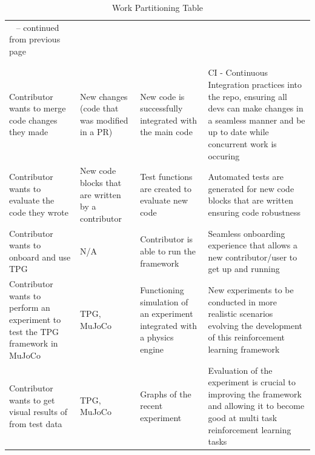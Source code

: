 \documentclass[12pt]{article}
\begin{document}
\begin{xltabular}{\textwidth}{   
  | >{\raggedright\arraybackslash}X 
  | >{\raggedright\arraybackslash}X 
  | >{\raggedright\arraybackslash}X 
  | >{\raggedright\arraybackslash}X | }
  \caption{Work Partitioning Table} \\
  
  \hline {} &  &  &  \\ \hline 
  \endfirsthead
  
  {\tablename\ \thetable{} -- continued from previous page} \\
  \hline {} &  &  &  \\ \hline 
  \endhead
  
  \hline {} \\ \hline
  \endfoot
  \hline
\endlastfoot
\hline
Contributor wants to merge code changes they made & New changes (code that was modified in a PR) & New code is successfully integrated with the main code & CI - Continuous Integration practices into the repo, ensuring all devs can make changes in a seamless manner and be up to date while concurrent work is occuring \\
\hline
Contributor wants to evaluate the code they wrote & New code blocks that are written by a contributor & Test functions are created to evaluate new code & Automated tests are generated for new code blocks that are written ensuring code robustness \\
\hline
Contributor wants to onboard and use TPG & N/A & Contributor is able to run the framework & Seamless onboarding experience that allows a new contributor/user to get up and running \\
\hline
Contributor wants to perform an experiment to test the TPG framework in MuJoCo & TPG, MuJoCo & Functioning simulation of an experiment integrated with a physics engine & New experiments to be conducted in more realistic scenarios evolving the development of this reinforcement learning framework \\
\hline
Contributor wants to get visual results of from test data & TPG, MuJoCo & Graphs of the recent experiment & Evaluation of the experiment is crucial to improving the framework and allowing it to become good at multi task reinforcement learning tasks \\

\end{xltabular}
\end{document}
